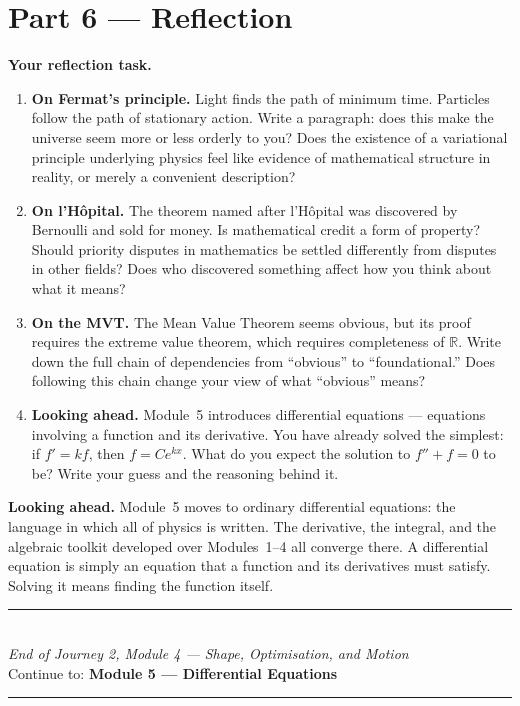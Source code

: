 \documentclass[12pt, a4paper]{article}
\begin{document}
\section{Part 6 \texorpdfstring{---}{--} Reflection}

\begin{reflectionbox}
\textbf{Your reflection task.}

\begin{enumerate}
  \item \textbf{On Fermat's principle.} Light finds the path of minimum time. Particles follow the path of stationary action. Write a paragraph: does this make the universe seem more or less orderly to you? Does the existence of a variational principle underlying physics feel like evidence of mathematical structure in reality, or merely a convenient description?

  \item \textbf{On l'H\^{o}pital.} The theorem named after l'H\^{o}pital was discovered by Bernoulli and sold for money. Is mathematical credit a form of property? Should priority disputes in mathematics be settled differently from disputes in other fields? Does who discovered something affect how you think about what it means?

  \item \textbf{On the MVT.} The Mean Value Theorem seems obvious, but its proof requires the extreme value theorem, which requires completeness of $\mathbb{R}$. Write down the full chain of dependencies from ``obvious'' to ``foundational.'' Does following this chain change your view of what ``obvious'' means?

  \item \textbf{Looking ahead.} Module~5 introduces differential equations --- equations involving a function and its derivative. You have already solved the simplest: if $f' = kf$, then $f = Ce^{kx}$. What do you expect the solution to $f'' + f = 0$ to be? Write your guess and the reasoning behind it.
\end{enumerate}
\end{reflectionbox}

\medskip
\noindent\textbf{Looking ahead.}
Module~5 moves to ordinary differential equations: the language in which all of physics is written. The derivative, the integral, and the algebraic toolkit developed over Modules~1--4 all converge there. A differential equation is simply an equation that a function and its derivatives must satisfy. Solving it means finding the function itself.

\vspace{1.4cm}
\begin{center}
{\color{MidBlue}\rule{0.5\linewidth}{0.8pt}}\\[6pt]
{\small\color{DarkGrey}\textit{End of Journey 2, Module 4 --- Shape, Optimisation, and Motion}}\\[4pt]
{\small\color{DarkGrey}Continue to: \textbf{Module 5 --- Differential Equations}}\\[6pt]
{\color{MidBlue}\rule{0.5\linewidth}{0.8pt}}
\end{center}
\end{document}
